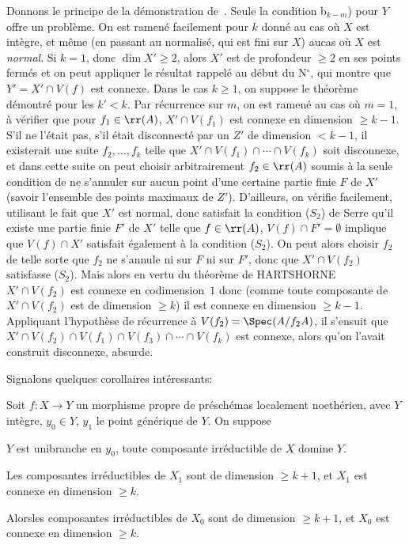 Donnons le principe de la d\'emonstration de~. Seule la condition b$_{k-m}$) pour $Y$ offre un probl\`eme. On est ramen\'e facilement pour $k$ donn\'e au cas o\`u $X$ est int\`egre, et m\^eme (en passant au normalis\'e, qui est fini sur $X$) au\pageoriginale cas o\`u $X$ est \emph{normal}. Si $k=1$, donc $\dim X' \ge 2$, alors $X'$ est de profondeur $\ge 2$ en ses points ferm\'es et on peut appliquer le r\'esultat rappel\'e au d\'ebut du N${}^\circ$, qui montre que \hbox{$Y'=X'\cap V(f)$} est connexe. Dans le cas $k\ge 1$, on suppose le th\'eor\`eme d\'emontr\'e pour les \hbox{$k'\!<\!k$}. Par r\'ecurrence sur $m$, on est ramen\'e au cas o\`u $m=1$, \ie \`a v\'erifier que pour $f_1\in\nobreak \rr(A)$, $X'\cap V(f_1)$ est connexe en dimension $\ge k-1$. S'il ne l'\'etait pas, \ie s'il \'etait disconnect\'e par un $Z'$ de dimension $< k-1$, il existerait une suite $f_2, \dotsc, f_k$ telle que \hbox{$X'\cap V(f_1)\cap\dotsb\cap V(f_k)$} soit disconnexe, et dans cette suite on peut choisir arbitrairement $f_2\in \rr(A)$ soumis \`a la seule condition de ne s'annuler sur aucun point d'une certaine partie finie $F$ de $X'$ (\ignorespaces savoir l'ensemble des points maximaux de $Z'$). D'ailleurs, on v\'erifie facilement, utilisant le fait que $X'$ est normal, donc satisfait la condition ({$S_2$}) de Serre qu'il existe une partie finie $F'$ de $X'$ telle que $f\in \rr(A)$, $V(f)\cap F'=\emptyset$ implique que $V(f)\cap X'$ satisfait \'egalement \`a la condition ({$S_2$}). On peut alors choisir $f_2$ de telle sorte que $f_2$ ne s'annule ni sur $F$ ni sur $F'$, donc que $X'\cap V(f_2)$ satisfasse ({$S_2$}). Mais alors en vertu du th\'eor\`eme de HARTSHORNE ~ $X'\cap V(f_2)$ est connexe en codimension~$1$ donc (comme toute composante de $X'\cap V(f_2)$ est de dimension $\ge k$) il est connexe en dimension $\ge k-1$. Appliquant l'hypoth\`ese de r\'ecurrence \`a $V(f_2)=\Spec(A/f_2A)$, il s'ensuit que $X'\cap V(f_2)\cap V(f_1)\cap V(f_3)\cap \dotsb\cap V(f_k)$ est connexe, alors qu'on l'avait construit disconnexe, absurde.

Signalons quelques corollaires int\'eressants:

\begin{corollaire} \label{XIII.2.2}
Soit $f\colon X\to Y$ un morphisme propre de pr\'esch\'emas localement noeth\'erien, avec $Y$ int\`egre, $y_0\in Y$, $y_1$ le point g\'en\'erique de $Y$. On suppose
\begin{enumeratea}
\item
$Y$ est unibranche en $y_0$, toute composante irr\'eductible de $X$ domine $Y$.
\item
Les composantes irr\'eductibles de $X_1$ sont de dimension $\ge k+1$, et $X_1$ est connexe en dimension $\ge k$.
\end{enumeratea}

Alors\pageoriginale les composantes irr\'eductibles de $X_0$ sont de dimension $\ge k+1$, et $X_0$ est connexe en dimension $\ge k$.
\end{corollaire}

